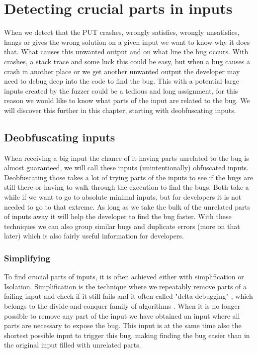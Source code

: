 \chapter{Detecting crucial parts in inputs}
\label{cha:3:intro}
When we detect that the PUT crashes, wrongly satisfies, wrongly unsatisfies, hangs or gives the wrong solution on a given input we want to know why it does that. What causes this unwanted output and on what line the bug occurs. With crashes, a stack trace and some luck this could be easy, but when a bug causes a crash in another place or we get another unwanted output the developer may need to debug deep into the code to find the bug. This with a potential large inputs created by the fuzzer could be a tedious and long assignment, for this reason we would like to know what parts of the input are related to the bug. We will discover this further in this chapter, starting with deobfuscating inputs.

\section{Deobfuscating inputs}
\label{cha:3:Deobfuscating}
When receiving a big input the chance of it having parts unrelated to the bug is almost guaranteed, we will call these inputs (unintentionally) obfuscated inputs. Deobfuscating those takes a lot of trying parts of the inputs to see if the bugs are still there \cite{bookZellerwhyProgramsFail} or having to walk through the execution to find the bugs. Both take a while if we want to go to absolute minimal inputs, but for developers it is not needed to go to that extreme. As long as we take the bulk of the unrelated parts of inputs away it will help the developer to find the bug faster. With these techniques we can also group similar bugs and duplicate errors (more on that later) which is also fairly useful information for developers.
\subsection{Simplifying}
\label{cha:3:Simplifying}
To find crucial parts of inputs, it is often achieved either with simplification or Isolation. 
Simplification is the technique where we repeatably remove parts of a failing input and check if it still fails and it often called "delta-debugging" \cite{bookZellerwhyProgramsFail}, which belongs to the divide-and-conquer family of algorithms \cite{2FuzzingAndDeltaDebuggingSMTSolvers}. 
When it is no longer possible to remove any part of the input we have obtained an input where all parts are necessary to expose the bug. This input is at the same time also the shortest possible input to trigger this bug, making finding the bug easier than in the original input filled with unrelated parts.

